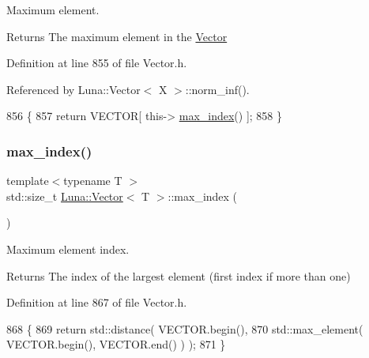 Maximum element. 

\begin{DoxyReturn}{Returns}
The maximum element in the \hyperlink{classLuna_1_1Vector}{Vector} 
\end{DoxyReturn}


Definition at line 855 of file Vector.\+h.



Referenced by Luna\+::\+Vector$<$ X $>$\+::norm\+\_\+inf().


\begin{DoxyCode}
856   \{
857     \textcolor{keywordflow}{return} VECTOR[ this-> \hyperlink{classLuna_1_1Vector_af7de15d570fa6cc999b5c900c220aaa5}{max\_index}() ];
858   \}
\end{DoxyCode}
\mbox{\label{classLuna_1_1Vector_af7de15d570fa6cc999b5c900c220aaa5}} 
\subsubsection{\texorpdfstring{max\+\_\+index()}{max\_index()}}
{\footnotesize\ttfamily template$<$typename T $>$ \\
std\+::size\+\_\+t \hyperlink{classLuna_1_1Vector}{Luna\+::\+Vector}$<$ T $>$\+::max\+\_\+index (\begin{DoxyParamCaption}{ }\end{DoxyParamCaption})\hspace{0.3cm}{\ttfamily [inline]}}



Maximum element index. 

\begin{DoxyReturn}{Returns}
The index of the largest element (first index if more than one) 
\end{DoxyReturn}


Definition at line 867 of file Vector.\+h.


\begin{DoxyCode}
868   \{
869     \textcolor{keywordflow}{return} std::distance( VECTOR.begin(),
870                            std::max\_element( VECTOR.begin(), VECTOR.end() ) );
871   \}
\end{DoxyCode}
\mbox{\label{classLuna_1_1Vector_a6d60809efe2e6d25d16ffa27303bd474}} 

